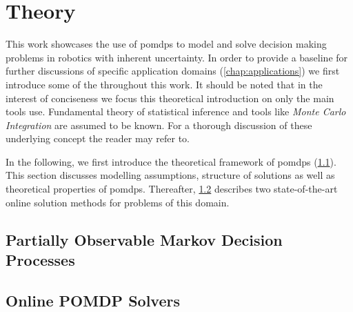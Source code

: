 \chapter{Theory}

This work showcases the use of \glspl{pomdp} to model and solve decision making
problems in robotics with inherent uncertainty. In order to provide a baseline
for further discussions of specific application domains
(\cref{chap:applications}) we first introduce some of the throughout this work.
It should be noted that in the interest of conciseness we focus this
theoretical introduction on only the main tools use. Fundamental theory of
statistical inference and tools like \textit{Monte Carlo Integration} are
assumed to be known. For a thorough discussion of these underlying concept the
reader may refer to.

In the following, we first introduce the theoretical framework of \glspl{pomdp}
(\cref{sec:pomdp}). This section discusses modelling assumptions, structure
of solutions as well as theoretical properties of \glspl{pomdp}. Thereafter,
\cref{sec:online-pomdp-solvers} describes two state-of-the-art online solution
methods for problems of this domain.

\section{Partially Observable Markov Decision Processes}\label{sec:pomdp}





\section{Online POMDP Solvers}\label{sec:online-pomdp-solvers}


